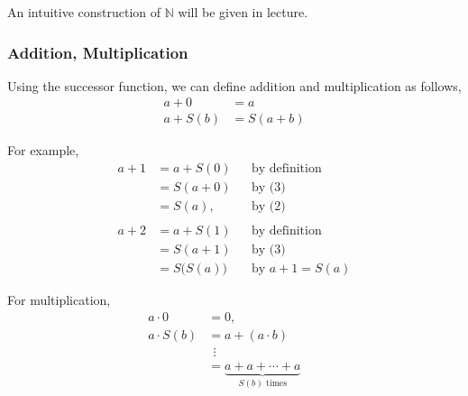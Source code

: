 \documentclass[letterpaper,twoside]{article}
\newenvironment{SorrellItemize}
{
    \setlength\parskip{-5pt}
    \begin{itemize}[leftmargin=11pt]
        \setlength\itemsep{-4pt}
}{
    \end{itemize}
}
\begin{document}
\begin{multicols}{2}

An intuitive construction of $\mathbb{N}$ will be given in lecture.



\subsubsection{Addition, Multiplication}

Using the successor function, we can define addition and multiplication as follows,
\begin{align}
    a + 0 &= a\\
    a+S(b)&= S(a+b)
\end{align}

For example,
\begin{align*}
    a + 1 &= a + S(0) &&\text{by definition}\\
          &= S(a+0) &&\text{by (3)}\\
          &= S(a), &&\text{by (2)}\\
          \\
    a + 2 &= a + S(1) &&\text{by definition}\\
          &= S(a+1)  &&\text{by (3)}\\
          &= S\big(S(a)\big)     &&\text{by }a + 1 = S(a)
\end{align*}

For multiplication,
\begin{align*}
    a \cdot 0 &= 0,\\
    a \cdot S(b) &= a + (a\cdot b)\\
    &\ \  \vdots\\
    &= \underbrace{a + a + \cdots + a}_{S(b) \text{ times}} &&\text{}
\end{align*}


\end{multicols}
\end{document}

